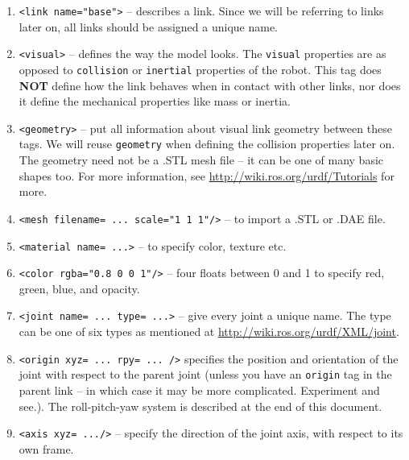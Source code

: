 \documentclass{article}
\begin{document}
\begin{enumerate}
\begin{enumerate}
                    \item \texttt{<link name="base">} -- describes a link. Since 
                    we will be referring to links later on, all links should be 
                    assigned a unique name.
                    \item \texttt{<visual>} -- defines the way 
                    the model looks. The \texttt{visual} properties are as opposed to 
                    \texttt{collision} or \texttt{inertial} properties of the robot.
                    This tag does \textbf{NOT} define how the link behaves when 
                    in contact with other links, nor does it define the mechanical 
                    properties like mass or inertia.
                    \item \texttt{<geometry>} -- put all information about visual 
                    link geometry between these tags. We will reuse \texttt{geometry} when 
                    defining the collision properties later on. The geometry need not 
                    be a .STL mesh file -- it can be one of many basic shapes too. For more information, 
                    see \url{http://wiki.ros.org/urdf/Tutorials} for more.
                    \item \texttt{<mesh filename= ... scale="1 1 1"/>} -- to import a .STL or .DAE file.
                    \item \texttt{<material name= ...>} -- to specify color, texture etc.
                    \item \texttt{<color rgba="0.8 0 0 1"/>} -- four floats between 0 and 1 to 
                    specify red, green, blue, and opacity.
                    \item \texttt{<joint name= ... type= ...>} -- give every joint a unique name.
                    The type can be one of six types as mentioned at \url{http://wiki.ros.org/urdf/XML/joint}.
                    \item \texttt{<origin xyz= ... rpy= ... />} specifies the position and orientation
                    of the joint with respect to the parent joint (unless you have an \texttt{origin} tag in the parent link
                    -- in which case it may be more complicated. Experiment and see.). The roll-pitch-yaw system is described
                    at the end of this document.
                    \item \texttt{<axis xyz= .../>} -- specify the direction of the 
                    joint axis, with respect to its own frame.

\end{enumerate}
\end{enumerate}
\end{document}
